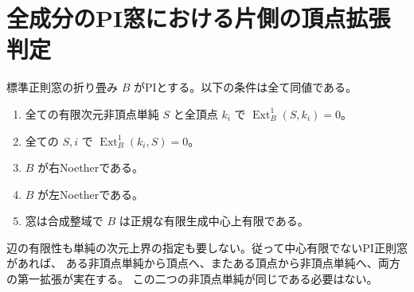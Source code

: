 \section{全成分のPI窓における片側の頂点拡張判定}
\label{sec:one-sided-pi-noether-criterion}
\begin{theorem}\label{thm:one-sided-pi-noether-criterion}
標準正則窓の折り畳み $B$ がPIとする。以下の条件は全て同値である。
\begin{enumerate}
\item 全ての有限次元非頂点単純 $S$ と全頂点 $k_i$ で $\operatorname{Ext}^1_B(S,k_i)=0$。
\item 全ての $S,i$ で $\operatorname{Ext}^1_B(k_i,S)=0$。
\item $B$ が右Noetherである。
\item $B$ が左Noetherである。
\item 窓は合成整域で $B$ は正規な有限生成中心上有限である。
\end{enumerate}
辺の有限性も単純の次元上界の指定も要しない。従って中心有限でないPI正則窓があれば、
ある非頂点単純から頂点へ、またある頂点から非頂点単純へ、両方の第一拡張が実在する。
この二つの非頂点単純が同じである必要はない。
\end{theorem}

